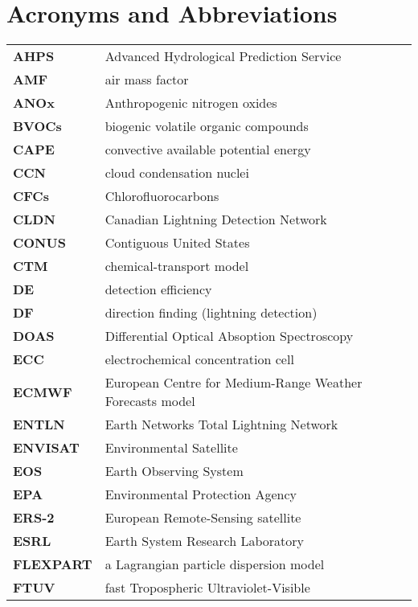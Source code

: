 \chapter{Acronyms and Abbreviations} \label{apdx:abbrev}

\ifpdf
    \graphicspath{{Appendix/figures/PNG/}{Appendix/figures/PDF/}{Appendix/figures/}}
\else
    \graphicspath{{Appendix/figures/EPS/}{Appendix/figures/}}
\fi

\begin{longtable}{p{1.5in}p{5.5in}}
\textbf{AHPS} & Advanced Hydrological Prediction Service\\
\textbf{AMF} & air mass factor\\
\textbf{ANOx} & Anthropogenic nitrogen oxides\\
\textbf{BVOCs} & biogenic volatile organic compounds\\
\textbf{CAPE} & convective available potential energy\\
\textbf{CCN} & cloud condensation nuclei\\
\textbf{CFCs} & Chlorofluorocarbons\\
\textbf{CLDN} & Canadian Lightning Detection Network\\
\textbf{CONUS} & Contiguous United States\\
\textbf{CTM} & chemical-transport model\\
\textbf{DE} & detection efficiency\\
\textbf{DF} & direction finding (lightning detection)\\
\textbf{DOAS} & Differential Optical Absoption Spectroscopy\\
\textbf{ECC} & electrochemical concentration cell\\
\textbf{ECMWF} & European Centre for Medium-Range Weather Forecasts model\\
\textbf{ENTLN} & Earth Networks Total Lightning Network\\
\textbf{ENVISAT} & Environmental Satellite\\
\textbf{EOS} & Earth Observing System\\
\textbf{EPA} & Environmental Protection Agency\\
\textbf{ERS-2} & European Remote-Sensing satellite\\
\textbf{ESRL} & Earth System Research Laboratory\\
\textbf{FLEXPART} & a Lagrangian particle dispersion model\\
\textbf{FTUV} & fast Tropospheric Ultraviolet-Visible\\

\end{longtable}
